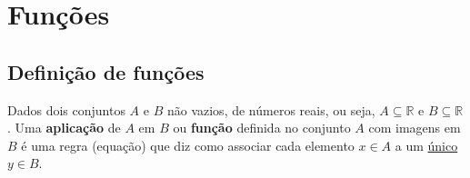 \chapter{Funções}

\section{Definição de funções}

\vskip0.3cm
 \colorbox{azul}{
 \begin{minipage}{0.9\linewidth}
 \begin{center}
  Dados dois conjuntos $A$ e $B$ não vazios, de números reais, ou seja, $A \subseteq \mathbb{R}$ e $B \subseteq \mathbb{R}$. Uma \textbf{aplicação} de $A$ em $B$ ou \textbf{função} definida no conjunto $A$ com imagens em $B$ é uma regra (equação) que diz como associar cada elemento $x \in A$ a um \underline{único} $y \in B$.
 \end{center}
 \end{minipage}}
 \vskip0.3cm


